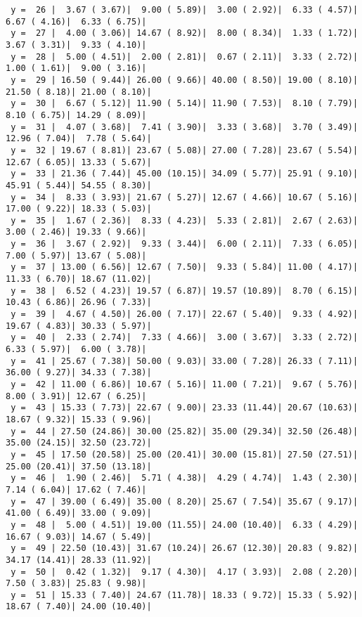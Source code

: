 \documentclass[10pt]{article}
\begin{document}
\begin{Verbatim}
 y =  26 |  3.67 ( 3.67)|  9.00 ( 5.89)|  3.00 ( 2.92)|  6.33 ( 4.57)|  6.67 ( 4.16)|  6.33 ( 6.75)|
 y =  27 |  4.00 ( 3.06)| 14.67 ( 8.92)|  8.00 ( 8.34)|  1.33 ( 1.72)|  3.67 ( 3.31)|  9.33 ( 4.10)|
 y =  28 |  5.00 ( 4.51)|  2.00 ( 2.81)|  0.67 ( 2.11)|  3.33 ( 2.72)|  1.00 ( 1.61)|  9.00 ( 3.16)|
 y =  29 | 16.50 ( 9.44)| 26.00 ( 9.66)| 40.00 ( 8.50)| 19.00 ( 8.10)| 21.50 ( 8.18)| 21.00 ( 8.10)|
 y =  30 |  6.67 ( 5.12)| 11.90 ( 5.14)| 11.90 ( 7.53)|  8.10 ( 7.79)|  8.10 ( 6.75)| 14.29 ( 8.09)|
 y =  31 |  4.07 ( 3.68)|  7.41 ( 3.90)|  3.33 ( 3.68)|  3.70 ( 3.49)| 12.96 ( 7.04)|  7.78 ( 5.64)|
 y =  32 | 19.67 ( 8.81)| 23.67 ( 5.08)| 27.00 ( 7.28)| 23.67 ( 5.54)| 12.67 ( 6.05)| 13.33 ( 5.67)|
 y =  33 | 21.36 ( 7.44)| 45.00 (10.15)| 34.09 ( 5.77)| 25.91 ( 9.10)| 45.91 ( 5.44)| 54.55 ( 8.30)|
 y =  34 |  8.33 ( 3.93)| 21.67 ( 5.27)| 12.67 ( 4.66)| 10.67 ( 5.16)| 17.00 ( 9.22)| 18.33 ( 5.03)|
 y =  35 |  1.67 ( 2.36)|  8.33 ( 4.23)|  5.33 ( 2.81)|  2.67 ( 2.63)|  3.00 ( 2.46)| 19.33 ( 9.66)|
 y =  36 |  3.67 ( 2.92)|  9.33 ( 3.44)|  6.00 ( 2.11)|  7.33 ( 6.05)|  7.00 ( 5.97)| 13.67 ( 5.08)|
 y =  37 | 13.00 ( 6.56)| 12.67 ( 7.50)|  9.33 ( 5.84)| 11.00 ( 4.17)| 11.33 ( 6.70)| 18.67 (11.02)|
 y =  38 |  6.52 ( 4.23)| 19.57 ( 6.87)| 19.57 (10.89)|  8.70 ( 6.15)| 10.43 ( 6.86)| 26.96 ( 7.33)|
 y =  39 |  4.67 ( 4.50)| 26.00 ( 7.17)| 22.67 ( 5.40)|  9.33 ( 4.92)| 19.67 ( 4.83)| 30.33 ( 5.97)|
 y =  40 |  2.33 ( 2.74)|  7.33 ( 4.66)|  3.00 ( 3.67)|  3.33 ( 2.72)|  6.33 ( 5.97)|  6.00 ( 3.78)|
 y =  41 | 25.67 ( 7.38)| 50.00 ( 9.03)| 33.00 ( 7.28)| 26.33 ( 7.11)| 36.00 ( 9.27)| 34.33 ( 7.38)|
 y =  42 | 11.00 ( 6.86)| 10.67 ( 5.16)| 11.00 ( 7.21)|  9.67 ( 5.76)|  8.00 ( 3.91)| 12.67 ( 6.25)|
 y =  43 | 15.33 ( 7.73)| 22.67 ( 9.00)| 23.33 (11.44)| 20.67 (10.63)| 18.67 ( 9.32)| 15.33 ( 9.96)|
 y =  44 | 27.50 (24.86)| 30.00 (25.82)| 35.00 (29.34)| 32.50 (26.48)| 35.00 (24.15)| 32.50 (23.72)|
 y =  45 | 17.50 (20.58)| 25.00 (20.41)| 30.00 (15.81)| 27.50 (27.51)| 25.00 (20.41)| 37.50 (13.18)|
 y =  46 |  1.90 ( 2.46)|  5.71 ( 4.38)|  4.29 ( 4.74)|  1.43 ( 2.30)|  7.14 ( 6.04)| 17.62 ( 7.46)|
 y =  47 | 39.00 ( 6.49)| 35.00 ( 8.20)| 25.67 ( 7.54)| 35.67 ( 9.17)| 41.00 ( 6.49)| 33.00 ( 9.09)|
 y =  48 |  5.00 ( 4.51)| 19.00 (11.55)| 24.00 (10.40)|  6.33 ( 4.29)| 16.67 ( 9.03)| 14.67 ( 5.49)|
 y =  49 | 22.50 (10.43)| 31.67 (10.24)| 26.67 (12.30)| 20.83 ( 9.82)| 34.17 (14.41)| 28.33 (11.92)|
 y =  50 |  0.42 ( 1.32)|  9.17 ( 4.30)|  4.17 ( 3.93)|  2.08 ( 2.20)|  7.50 ( 3.83)| 25.83 ( 9.98)|
 y =  51 | 15.33 ( 7.40)| 24.67 (11.78)| 18.33 ( 9.72)| 15.33 ( 5.92)| 18.67 ( 7.40)| 24.00 (10.40)|

\end{Verbatim}
\end{document}

